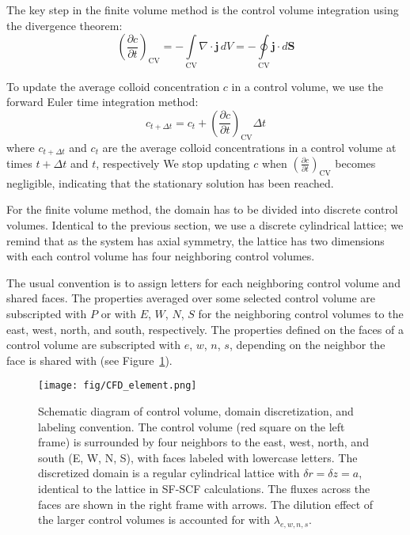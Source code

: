 \documentclass[10pt, a4paper]{article}
\begin{document}
\begin{multicols}{2}
The key step in the finite volume method is the control volume integration using the divergence theorem:
\begin{equation}
    \label{eq:CFD_integration_1}
    \left( \frac{\partial c}{\partial t} \right)_{\text{CV}} = -\int\limits_{\text{CV}} \nabla \cdot \mathbf{j} \, dV = -\oint\limits_{\text{CV}} \mathbf{j} \cdot d\mathbf{S}
\end{equation}

To update the average colloid concentration $c$ in a control volume, we use the forward Euler time integration method:
\begin{equation}
    c_{t + \Delta t} = c_t + \left( \frac{\partial c}{\partial t} \right)_{\text{CV}} \Delta t
\end{equation}
where $c_{t + \Delta t}$ and $c_t$ are the average colloid concentrations in a control volume at times $t + \Delta t$ and $t$, respectively
We stop updating $c$ when $\left( \frac{\partial c}{\partial t} \right)_{\text{CV}}$ becomes negligible, indicating that the stationary solution has been reached.

For the finite volume method, the domain has to be divided into discrete control volumes.
Identical to the previous section, we use a discrete cylindrical lattice; we remind that as the system has axial symmetry, the lattice has two dimensions with each control volume has four neighboring control volumes.

The usual convention is to assign letters for each neighboring control volume and shared faces.
The properties averaged over some selected control volume are subscripted with $P$ or with $E$, $W$, $N$, $S$ for the neighboring control volumes to the east, west, north, and south, respectively.
The properties defined on the faces of a control volume are subscripted with $e$, $w$, $n$, $s$, depending on the neighbor the face is shared with (see Figure~\ref{fig:CFD_element}).

\begin{figure}[H]
    \centering
    \texttt{[image: fig/CFD\_element.png]}
    \caption{
        Schematic diagram of control volume, domain discretization, and labeling convention.
        The control volume (red square on the left frame) is surrounded by four neighbors to the east, west, north, and south (E, W, N, S), with faces labeled with lowercase letters.
        The discretized domain is a regular cylindrical lattice with $\delta r = \delta z = a$, identical to the lattice in SF-SCF calculations.
        The fluxes across the faces are shown in the right frame with arrows.
        The dilution effect of the larger control volumes is accounted for with $\lambda_{e,w,n,s}$.
        }
    \label{fig:CFD_element}
\end{figure}


\end{multicols}
\end{document}
